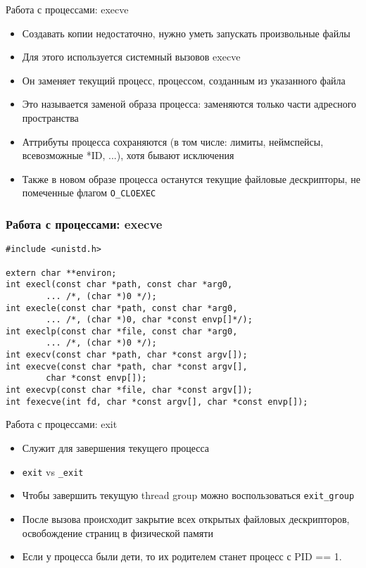 \documentclass[10pt,pdf,hyperref={unicode}]{beamer}
\begin{document}
\begin{frame}{Работа с процессами: execve}
\begin{itemize}
    \item Создавать копии недостаточно, нужно уметь запускать произвольные файлы
    \item Для этого используется системный вызовов execve
    \item Он заменяет текущий процесс, процессом, созданным из указанного файла
    \item Это называется заменой образа процесса: заменяются только части адресного пространства
    \item Аттрибуты процесса сохраняются (в том числе: лимиты, неймспейсы, всевозможные *ID, ...), хотя бывают исключения
    \item Также в новом образе процесса останутся текущие файловые дескрипторы, не помеченные флагом \texttt{O_CLOEXEC}
\end{itemize}
\end{frame}

\begin{frame}[fragile]
\frametitle{Работа с процессами: execve}
\begin{center}
\begin{minipage}{0.95\textwidth}
\begin{verbatim}
#include <unistd.h>

extern char **environ;
int execl(const char *path, const char *arg0,
        ... /*, (char *)0 */);
int execle(const char *path, const char *arg0,
        ... /*, (char *)0, char *const envp[]*/);
int execlp(const char *file, const char *arg0,
        ... /*, (char *)0 */);
int execv(const char *path, char *const argv[]);
int execve(const char *path, char *const argv[],
        char *const envp[]);
int execvp(const char *file, char *const argv[]);
int fexecve(int fd, char *const argv[], char *const envp[]);
\end{verbatim}
\end{minipage}
\end{center}
\end{frame}

\begin{frame}{Работа с процессами: exit}
\begin{itemize}
    \item Служит для завершения текущего процесса
    \item \texttt{exit} vs \texttt{_exit}
    \item Чтобы завершить текущую thread group можно воспользоваться \texttt{exit_group}
    \item После вызова происходит закрытие всех открытых файловых дескрипторов, освобождение страниц в физической памяти
    \item Если у процесса были дети, то их родителем станет процесс с PID == 1.
\end{itemize}
\end{frame}
\end{document}
